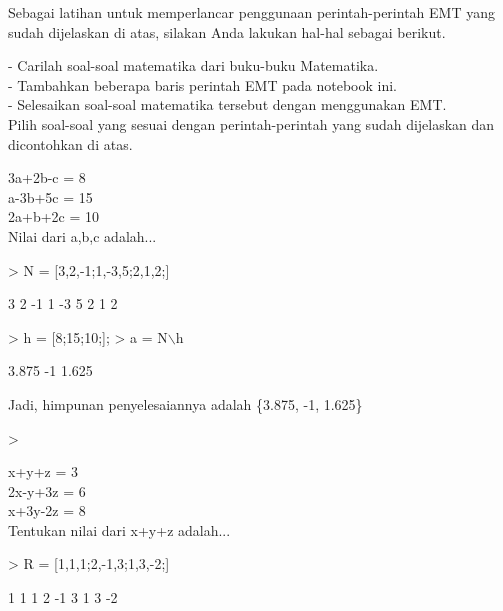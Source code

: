 \documentclass[a4paper,10pt]{article}
\begin{document}
\begin{eulernotebook}
\begin{eulercomment}
\begin{eulercomment}
\begin{eulercomment}
\begin{eulercomment}
\begin{eulercomment}
Sebagai latihan untuk memperlancar penggunaan perintah-perintah EMT
yang sudah dijelaskan di atas, silakan Anda lakukan hal-hal sebagai
berikut.

- Carilah soal-soal matematika dari buku-buku Matematika.\\
- Tambahkan beberapa baris perintah EMT pada notebook ini.\\
- Selesaikan soal-soal matematika tersebut dengan menggunakan EMT.\\
Pilih soal-soal yang sesuai dengan perintah-perintah yang sudah
dijelaskan dan dicontohkan di atas.

3a+2b-c = 8\\
a-3b+5c = 15\\
2a+b+2c = 10\\
Nilai dari a,b,c adalah...
\end{eulercomment}
\begin{eulerprompt}
> N = [3,2,-1;1,-3,5;2,1,2;]  
\end{eulerprompt}
\begin{euleroutput}
              3             2            -1 
              1            -3             5 
              2             1             2 
\end{euleroutput}
\begin{eulerprompt}
> h = [8;15;10;];
> a = N\(\backslash\)h
\end{eulerprompt}
\begin{euleroutput}
          3.875 
             -1 
          1.625 
\end{euleroutput}
\begin{eulercomment}
Jadi, himpunan penyelesaiannya adalah \{3.875, -1, 1.625\}
\end{eulercomment}
\begin{eulerprompt}
> 
\end{eulerprompt}
\begin{eulercomment}
x+y+z = 3\\
2x-y+3z = 6\\
x+3y-2z = 8\\
Tentukan nilai dari x+y+z adalah...
\end{eulercomment}
\begin{eulerprompt}
> R = [1,1,1;2,-1,3;1,3,-2;]
\end{eulerprompt}
\begin{euleroutput}
              1             1             1 
              2            -1             3 
              1             3            -2 
\end{euleroutput}

\end{eulercomment}
\end{eulercomment}
\end{eulercomment}
\end{eulercomment}
\end{eulernotebook}
\end{document}
